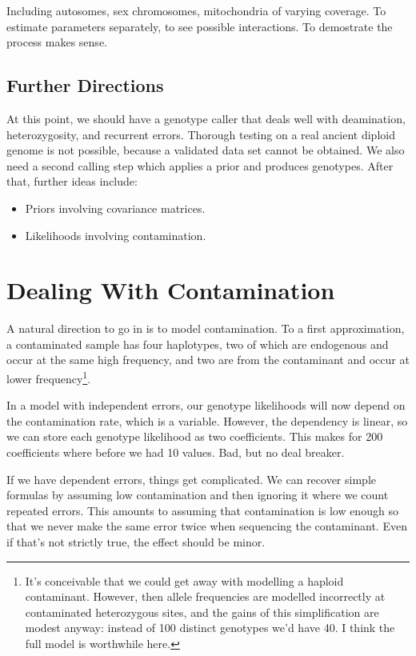\documentclass{article}
\begin{document}
Including autosomes, sex chromosomes, mitochondria of
varying coverage.  To estimate parameters separately, to see possible
interactions.  To demostrate the process makes sense. 

\subsection{Further Directions}

At this point, we should have a genotype caller that deals well with
deamination, heterozygosity, and recurrent errors.  Thorough testing on
a real ancient diploid genome is not possible, because a validated data
set cannot be obtained.  We also need a second calling step which
applies a prior and produces genotypes.  After that, further ideas
include: 

\begin{itemize}
\item Priors involving covariance matrices.
\item Likelihoods involving contamination.
\end{itemize}

\section{Dealing With Contamination}

A natural direction to go in is to model contamination.  To a first
approximation, a contaminated sample has four haplotypes, two of which
are endogenous and occur at the same high frequency, and two are from
the contaminant and occur at lower frequency\footnote{It's conceivable
that we could get away with modelling a haploid contaminant.  However,
then allele frequencies are modelled incorrectly at contaminated
heterozygous sites, and the gains of this simplification are modest
anyway:  instead of 100 distinct genotypes we'd have 40.  I think the
full model is worthwhile here.}.

In a model with independent errors, our genotype likelihoods will now
depend on the contamination rate, which is a variable.  However, the
dependency is linear, so we can store each genotype
likelihood as two coefficients.  This makes for 200 coefficients where
before we had 10 values.  Bad, but no deal breaker.

If we have dependent errors, things get complicated.  We can recover
simple formulas by assuming low contamination and then ignoring it where
we count repeated errors.  This amounts to assuming that contamination
is low enough so that we never make the same error twice when sequencing
the contaminant.  Even if that's not strictly true, the effect should be
minor.
\end{document}

